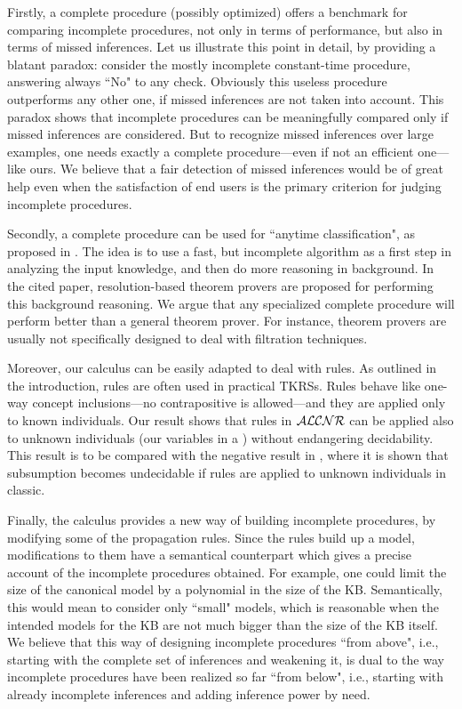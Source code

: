 Firstly, a complete procedure (possibly optimized) offers a benchmark for
comparing incomplete procedures, not only in terms of performance, but also in
terms of missed inferences. Let us illustrate this point in detail, by
providing a blatant paradox: consider the mostly incomplete constant-time
procedure, answering always ``No" to any check. Obviously this useless
procedure outperforms any other one, if missed inferences are not taken into
account. This paradox shows that incomplete procedures can be meaningfully
compared only if missed inferences are considered. But to recognize
missed inferences over large examples, one needs exactly a complete
procedure---even if not an efficient one---like ours. We believe that
a fair detection of missed inferences would be of great help even when the
satisfaction of end users is the primary criterion for judging incomplete
procedures.

Secondly, a complete procedure can be used for ``anytime classification", as
proposed in \cite{MacG92}. The idea is to use a fast, but incomplete algorithm
as a first step in analyzing the input knowledge, and then do more reasoning in
background. In the cited paper, resolution-based theorem provers are proposed
for performing this background reasoning. We argue that any specialized complete
procedure will perform better than a general theorem prover. For instance,
theorem provers are usually not specifically designed to deal with filtration
techniques.

Moreover, our calculus can be easily adapted to deal with rules. 
As outlined in the introduction, rules are often used in practical
TKRSs. Rules behave like one-way concept inclusions---no
contrapositive is allowed---and they are applied only to known individuals.
Our result shows that rules in ${\cal ALCNR}$ can be applied also to
unknown individuals (our variables in a \cs) without endangering decidability.
This result is to be compared with the negative result in \cite{BaHo92}, 
where it is shown that  subsumption becomes undecidable if rules are applied to
unknown individuals in {\sc classic}.

Finally, the calculus provides a new way of building incomplete procedures,  by
modifying some of the propagation rules. Since the rules build up a model,
modifications to them have a semantical counterpart which gives a precise
account of the incomplete procedures obtained. For example, one could limit the
size of the canonical model by a polynomial in the size of the KB.
Semantically, this would mean to consider only ``small" models, which is
reasonable when the intended models for the KB are not much bigger than the
size of the KB itself.  We believe that this way of designing incomplete
procedures ``from above", i.e., starting with the complete set of inferences and
weakening it, is dual to the way incomplete procedures have been realized so
far ``from below", i.e., starting with already incomplete inferences and adding
inference power by need.


